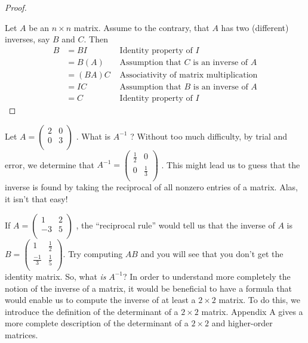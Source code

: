 \documentclass[10pt,]{book}
\theoremstyle{plain}
\theoremstyle{definition}
\theoremstyle{definition}
\theoremstyle{definition}
\theoremstyle{definition}
\begin{document}
\begin{proof}\hypertarget{proof-1}{}
Let \(A\) be an \(n\times n\) matrix. Assume to the contrary, that \(A\) has two (different) inverses, say \(B\) and \(C\). Then
\begin{equation*}
\begin{split}
B &= B I  & \textrm{ Identity property of } I\\
& =B (A  ) & \textrm{ Assumption that } C \textrm{ is an inverse of } A\\
& = (B A) C & \textrm{ Associativity of matrix multiplication}\\
& = I C  & \textrm{ Assumption that } B \textrm{ is an inverse of } A\\
& = C & \textrm{ Identity property of } I
\end{split}
\end{equation*}%
\end{proof}
\par
Let \(A =\left(
\begin{array}{cc}
 2 & 0 \\
 0 & 3  \\
\end{array}
\right)\) .  What is \(A^{-1}\) ? Without too much difficulty, by trial and error, we determine that \(A^{-1}= \left(
\begin{array}{cc}
 \frac{1}{2} & 0 \\
 0 & \frac{1}{3} \\
\end{array}
\right)\) . This might lead us to guess that the inverse is found by taking the reciprocal of all nonzero entries of a matrix. Alas, it isn't
that easy!%
\par
If \(A =\left(
\begin{array}{cc}
 1 & 2 \\
 -3 & 5 \\
\end{array}
\right)\) , the ``reciprocal rule'' would tell us that the inverse of \(A\) is \(B=\left(
\begin{array}{cc}
 1 & \frac{1}{2} \\
 \frac{-1}{3} & \frac{1}{5} \\
\end{array}
\right)\). Try computing \(A B\) and you will see that you don't get the identity matrix.  So, what \emph{is} \(A^{-1}\)? In order to understand more completely the notion of the inverse of a matrix, it would be beneficial to have a formula that would enable us to compute the inverse of at least a \(2\times 2\) matrix. To do this, we introduce the definition of the determinant of a \(2\times 2\) matrix. Appendix A gives a more complete description of the determinant of a \(2\times 2\) and higher-order matrices.%
\end{document}
